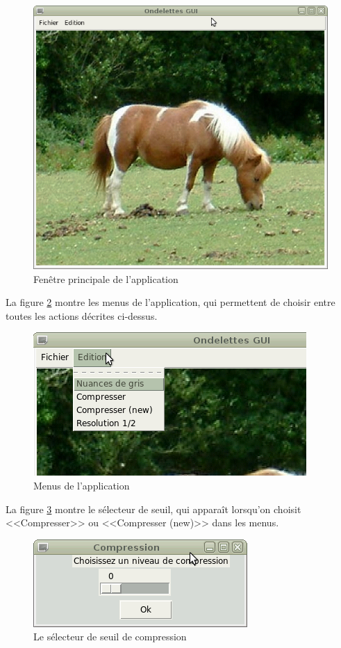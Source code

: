 \documentclass{article}
\begin{document}
\begin{figure}[!hb]
\centering
\includegraphics[scale=0.5]{OndelettesGUI.png}
\caption{Fenêtre principale de l'application}
\label{GUI}
\end{figure}


La figure \ref{GUI1} montre les menus de l'application, qui permettent de choisir entre toutes les actions décrites ci-dessus.

\begin{figure}[!ht]
\centering
\includegraphics[scale=0.8]{OndelettesGUI1.png}
\caption{Menus de l'application}
\label{GUI1}
\end{figure}

La figure \ref{GUI2} montre le sélecteur de seuil, qui apparaît lorsqu'on choisit <<Compresser>> ou <<Compresser (new)>> dans les menus.

\begin{figure}[!hb]
\centering
\includegraphics[scale=0.8]{Compression.png}
\caption{Le sélecteur de seuil de compression}
\label{GUI2}
\end{figure}
\end{document}
